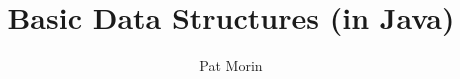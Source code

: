 \documentclass{book}
\title{Basic Data Structures (in Java)}
\author{Pat Morin}
\begin{document}
\begin{titlepage}
\maketitle
\thispagestyle{empty}
\end{titlepage}

\tableofcontents


\end{document}
